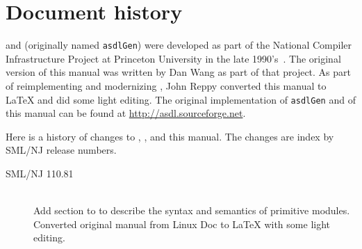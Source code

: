 %
\chapter{Document history}
\label{ch:history}

\asdl{} and \asdlgen{} (originally named \texttt{asdlGen}) were developed as part
of the National Compiler Infrastructure Project at Princeton University in the
late 1990's~\cite{usenix:zephyr-asdl}.
The original version of this manual was written by Dan Wang as part of that project.
As part of reimplementing and modernizing \asdl{}, John Reppy converted this manual
to \LaTeX{} and did some light editing.
The original implementation of \texttt{asdlGen} and of this manual can be
found at \url{http://asdl.sourceforge.net}.

Here is a history of changes to \asdl{}, \asdlgen{}, and this manual.
The changes are index by SML/NJ release numbers.

\begin{description}
  \item[SML/NJ 110.81]
    \mbox{}\\[0.5em]
    Add section to  to describe the syntax and semantics of primitive modules.
    \\[0.5em]
    Converted original manual from Linux Doc to \LaTeX{} with some light editing.
\end{description}%

